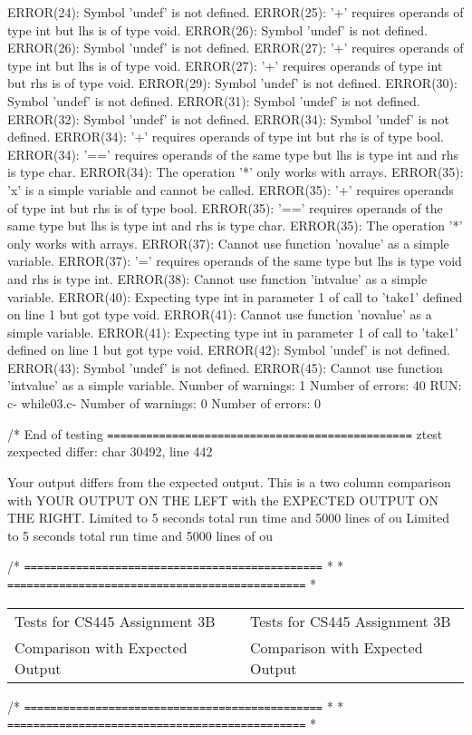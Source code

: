 \documentclass[12pt]{book}
\begin{document}
ERROR(24): Symbol 'undef' is not defined.
ERROR(25): '+' requires operands of type int but lhs is of type void.
ERROR(26): Symbol 'undef' is not defined.
ERROR(26): Symbol 'undef' is not defined.
ERROR(27): '+' requires operands of type int but lhs is of type void.
ERROR(27): '+' requires operands of type int but rhs is of type void.
ERROR(29): Symbol 'undef' is not defined.
ERROR(30): Symbol 'undef' is not defined.
ERROR(31): Symbol 'undef' is not defined.
ERROR(32): Symbol 'undef' is not defined.
ERROR(34): Symbol 'undef' is not defined.
ERROR(34): '+' requires operands of type int but rhs is of type bool.
ERROR(34): '==' requires operands of the same type but lhs is type int and rhs is type char.
ERROR(34): The operation '*' only works with arrays.
ERROR(35): 'x' is a simple variable and cannot be called.
ERROR(35): '+' requires operands of type int but rhs is of type bool.
ERROR(35): '==' requires operands of the same type but lhs is type int and rhs is type char.
ERROR(35): The operation '*' only works with arrays.
ERROR(37): Cannot use function 'novalue' as a simple variable.
ERROR(37): '=' requires operands of the same type but lhs is type void and rhs is type int.
ERROR(38): Cannot use function 'intvalue' as a simple variable.
ERROR(40): Expecting type int in parameter 1 of call to 'take1' defined on line 1 but got type void.
ERROR(41): Cannot use function 'novalue' as a simple variable.
ERROR(41): Expecting type int in parameter 1 of call to 'take1' defined on line 1 but got type void.
ERROR(42): Symbol 'undef' is not defined.
ERROR(43): Symbol 'undef' is not defined.
ERROR(45): Cannot use function 'intvalue' as a simple variable.
Number of warnings: 1
Number of errors: 40
RUN: c- while03.c-
Number of warnings: 0
Number of errors: 0

/* End of testing
\texttt{===============================================}
ztest zexpected differ: char 30492, line 442

Your output differs from the expected output.
This is a two column comparison with YOUR OUTPUT ON THE LEFT
with the EXPECTED OUTPUT ON THE RIGHT.
Limited to 5 seconds total run time and 5000 lines of ou        Limited to 5 seconds total run time and 5000 lines of ou

/* \texttt{==============================================} *                * \texttt{==============================================} *
\begin{center}
\begin{tabular}{lll}
Tests for CS445 Assignment 3B &  & Tests for CS445 Assignment 3B\\
Comparison with Expected Output &  & Comparison with Expected Output\\
\end{tabular}
\end{center}
/* \texttt{==============================================} *                * \texttt{==============================================} *
\end{document}
